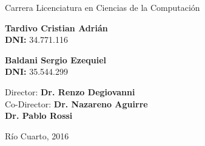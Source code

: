 \documentclass[12pt]{report}
\begin{document}
\begin{titlepage}
\begin{center}
{			Carrera Licenciatura en Ciencias de la Computaci\'on \vspace{0.5cm}}
			
			{\large \textbf{Tardivo Cristian Adri\'an \\ DNI:} 34.771.116}\vspace{0cm}
			
			{\large \textbf{Baldani Sergio Ezequiel \\ DNI:} 35.544.299}\vspace{0.5cm}
			
			{
				\large Director: \textbf{Dr. Renzo Degiovanni}\\
				\vspace{0,25cm}
				Co-Director: \textbf{Dr. Nazareno Aguirre}\\
				             \hspace{1.6cm}\textbf{Dr. Pablo Rossi}
			}
            \vspace{0,5cm}
			
			{\large R\'io Cuarto, 2016}
			\end{center}
	\end{titlepage}



\setcounter{tocdepth}{4}
\setcounter{secnumdepth}{4}
\setlength{\cftbeforetoctitleskip}{-5em}
\tableofcontents






\end{document}
